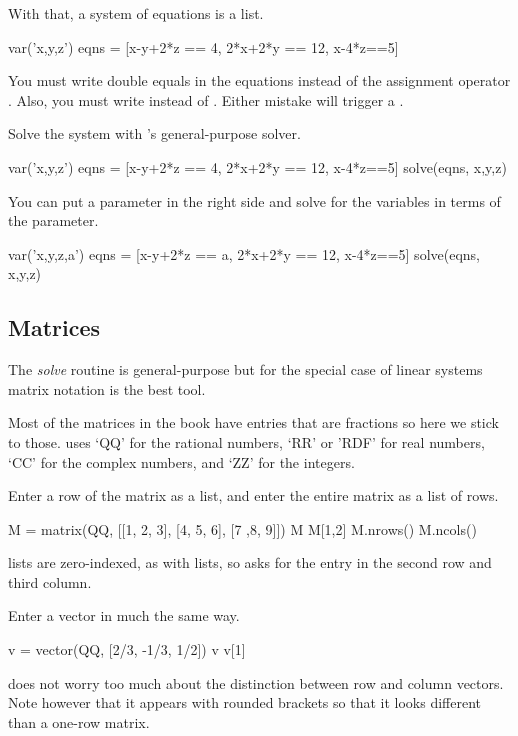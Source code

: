 With that, a system of equations is a list.
\begin{sageoutput}
var('x,y,z')                                  
eqns = [x-y+2*z == 4, 2*x+2*y == 12, x-4*z==5]
\end{sageoutput}
\noindent
You must write double equals \inlinecode{==} in the equations instead of 
the assignment operator \inlinecode{=}.
Also, you must write 
instead of .
Either mistake will trigger a  
.

Solve the system with \Sage's general-purpose solver.
\begin{sageoutput}[d,0,2]
var('x,y,z')                                  
eqns = [x-y+2*z == 4, 2*x+2*y == 12, x-4*z==5]
solve(eqns, x,y,z)                            
\end{sageoutput}

You can put a parameter in the right side and solve for the variables
in terms of the parameter.
\begin{sageoutput}
var('x,y,z,a')                                
eqns = [x-y+2*z == a, 2*x+2*y == 12, x-4*z==5]
solve(eqns, x,y,z) 
\end{sageoutput}



\subsection{Matrices}
The \textit{solve} routine is general-purpose but 
for the special case of linear systems matrix notation is the best tool.
 
Most of the matrices in the book
have entries that are fractions so here we stick
to those.
\Sage{} uses `QQ' for the rational numbers,
`RR' or 'RDF' for real numbers,
`CC' for the complex numbers,
and
`ZZ' for the integers.

Enter a row of the matrix as a list, and
enter the entire matrix as a list of rows.
\begin{sageoutput}
M = matrix(QQ, [[1, 2, 3], [4, 5, 6], [7 ,8, 9]])
M
M[1,2]
M.nrows()
M.ncols()
\end{sageoutput}
\noindent
\Sage{} lists are zero-indexed, as with \python{} lists, 
so  asks
for the entry in the second row and third column. 

Enter a vector in much the same way.
\begin{sageoutput}
v = vector(QQ, [2/3, -1/3, 1/2])
v
v[1]
\end{sageoutput}
\noindent
\Sage{} does not worry too much about the distinction between row and column
vectors.
Note however that
it appears with rounded brackets so that 
it looks different than a one-row matrix.

